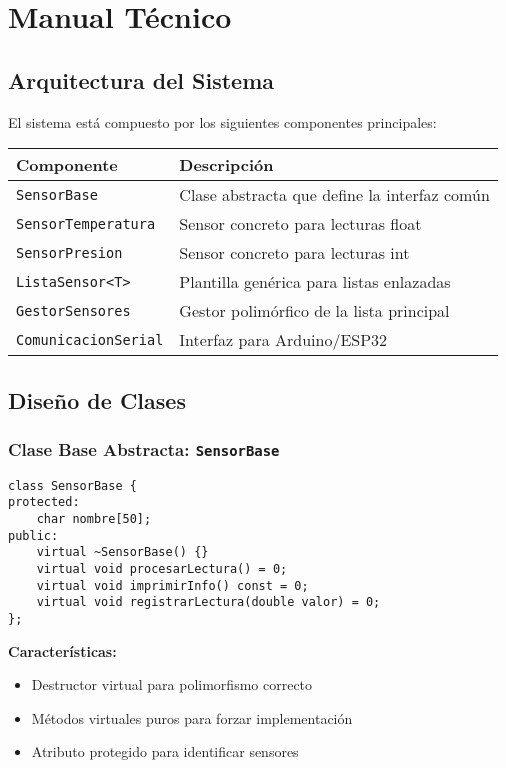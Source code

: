 \documentclass[12pt, spanish]{article}
\newcommand{\secc}[1]{\section{#1}\vspace{0.3cm}}
\begin{document}
\secc{Manual Técnico}

\subsection{Arquitectura del Sistema}

El sistema está compuesto por los siguientes componentes principales:

\begin{center}
\begin{tabularx}{\textwidth}{|X|X|}
\hline
\textbf{Componente} & \textbf{Descripción} \\
\hline
\texttt{SensorBase} & Clase abstracta que define la interfaz común \\
\hline
\texttt{SensorTemperatura} & Sensor concreto para lecturas float \\
\hline
\texttt{SensorPresion} & Sensor concreto para lecturas int \\
\hline
\texttt{ListaSensor<T>} & Plantilla genérica para listas enlazadas \\
\hline
\texttt{GestorSensores} & Gestor polimórfico de la lista principal \\
\hline
\texttt{ComunicacionSerial} & Interfaz para Arduino/ESP32 \\
\hline
\end{tabularx}
\end{center}

\subsection{Diseño de Clases}

\subsubsection{Clase Base Abstracta: \texttt{SensorBase}}

\begin{lstlisting}
class SensorBase {
protected:
    char nombre[50];
public:
    virtual ~SensorBase() {}
    virtual void procesarLectura() = 0;
    virtual void imprimirInfo() const = 0;
    virtual void registrarLectura(double valor) = 0;
};
\end{lstlisting}

\textbf{Características:}
\begin{itemize}
    \item Destructor virtual para polimorfismo correcto
    \item Métodos virtuales puros para forzar implementación
    \item Atributo protegido para identificar sensores
\end{itemize}
\end{document}
